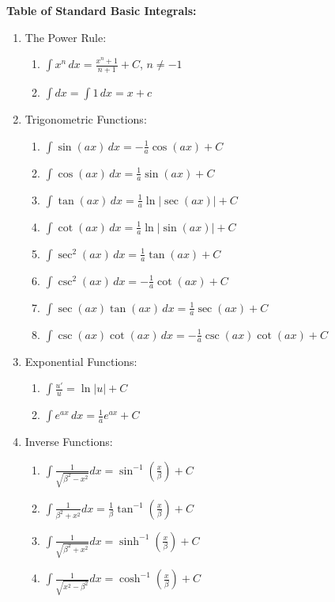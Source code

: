 \documentclass[14pt]{article}
\begin{document}
    \textbf{Table of Standard Basic Integrals:}
    \begin{enumerate}
        \item The Power Rule:
        \begin{enumerate}
            \item $\int x^n \, dx= \frac{x^n+1}{n+1}+C$, $n\neq-1$
            \item $\int dx=\int 1\, dx= x+c$
        \end{enumerate}
        \item Trigonometric Functions:
        \begin{enumerate}
            \item $\int\sin(ax)\, dx=-\frac{1}{a}\cos(ax)+C$
            \item $\int\cos(ax)\, dx=\frac{1}{a}\sin(ax)+C$
            \item $\int\tan(ax)\, dx=\frac{1}{a}\ln|\sec(ax)|+C$
            \item $\int\cot(ax)\, dx=\frac{1}{a}\ln|\sin(ax)|+C$
            \item $\int\sec^2(ax)\, dx=\frac{1}{a}\tan(ax)+C$
            \item $\int\csc^2(ax)\, dx=-\frac{1}{a}\cot(ax)+C$
            \item $\int\sec(ax)\tan(ax)\, dx=\frac{1}{a}\sec(ax)+C$
            \item $\int\csc(ax)\cot(ax)\, dx=-\frac{1}{a}\csc(ax)\cot(ax)+C$
        \end{enumerate}
        \item Exponential Functions:
        \begin{enumerate}
            \item $\int\frac{u'}{u}=\ln|u|+C$
            \item $\int e^{ax}\, dx=\frac{1}{a} e^{ax}+C$
        \end{enumerate}
        \item Inverse Functions:
        \begin{enumerate}
            \item $\int\frac{1}{\sqrt{\beta^2-x^2}}dx=\sin^{-1}\left(\frac{x}{\beta}\right)+C$
            \item $\int\frac{1}{\beta^2+x^2}dx=\frac{1}{\beta}\tan^{-1}\left(\frac{x}{\beta}\right)+C$
            \item $\int\frac{1}{\sqrt{\beta^2+x^2}}dx=\sinh^{-1}\left(\frac{x}{\beta}\right)+C$
            \item $\int\frac{1}{\sqrt{x^2-\beta^2}}dx=\cosh^{-1}\left(\frac{x}{\beta}\right)+C$
        \end{enumerate}
    \end{enumerate}
\end{document}
